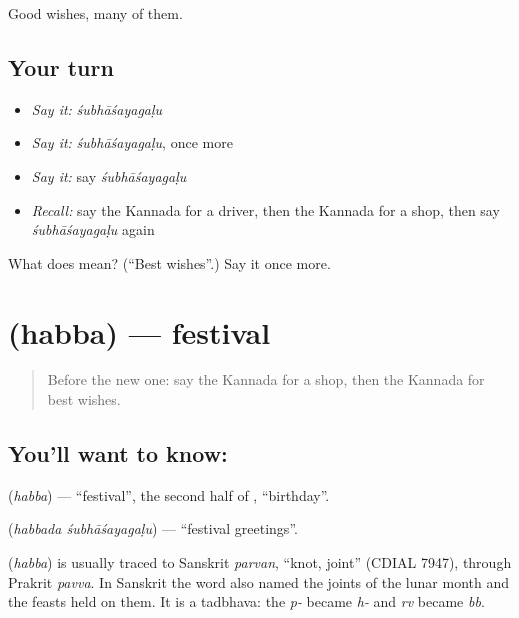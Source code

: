 \begin{grammarlens}[title={What you've built}]
Good wishes, many of them.
\end{grammarlens}

\subsection*{Your turn}
\begin{itemize}
\raggedright
  \item \emph{Say it:} \emph{śubhāśayagaḷu}
  \item \emph{Say it:} \emph{śubhāśayagaḷu}, once more
  \item \emph{Say it:} say \emph{śubhāśayagaḷu}
  \item \emph{Recall:} say the Kannada for a driver, then the Kannada for a shop, then say \emph{śubhāśayagaḷu} again
\end{itemize}

\begin{tcolorbox}[breakable,colback=teal!4,colframe=teal!35!black,title={Before you move on}]
What does  mean? (\textquotedblleft{}Best wishes\textquotedblright{}.) Say it once more.
\end{tcolorbox}
\section[\texorpdfstring{\kn{ಹಬ್ಬ} (habba)}{ಹಬ್ಬ (habba)}]{ (habba) — festival}

\label{lesson:KA-C105-festival}



\begin{quote}
Before the new one: say the Kannada for a shop, then the Kannada for best wishes.
\end{quote}

\subsection*{You'll want to know: }
\textbf{} (\emph{habba}) — \textquotedblleft{}festival\textquotedblright{}, the second half of \textbf{}, \textquotedblleft{}birthday\textquotedblright{}.

\textbf{ } (\emph{habbada śubhāśayagaḷu}) — \textquotedblleft{}festival greetings\textquotedblright{}.

\begin{cousinweb}
\textbf{} (\emph{habba}) is usually traced to Sanskrit \emph{parvan}, \textquotedblleft{}knot, joint\textquotedblright{} (CDIAL 7947), through Prakrit \emph{pavva}. In Sanskrit the word also named the joints of the lunar month and the feasts held on them. It is a tadbhava: the \emph{p-} became \emph{h-} and \emph{rv} became \emph{bb}.
\end{cousinweb}

